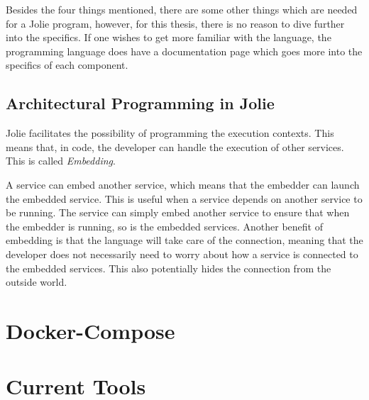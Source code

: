 Besides the four things mentioned, there are some other things which are needed for a Jolie program, however, for this thesis, there is no reason to dive further into the specifics. 
If one wishes to get more familiar with the language, the programming language does have a documentation page which goes more into the specifics of each component.

\subsection{Architectural Programming in Jolie}
Jolie facilitates the possibility of programming the execution contexts.
This means that, in code, the developer can handle the execution of other services. This is called \textit{Embedding}.

A service can embed another service, which means that the embedder can launch the embedded service. This is useful when a service depends on another service to be running.
The service can simply embed another service to ensure that when the embedder is running, so is the embedded services.
Another benefit of embedding is that the language will take care of the connection, meaning that the developer does not necessarily need to worry about how a service is connected to the embedded services.
This also potentially hides the connection from the outside world. 

\section{Docker-Compose}

\section{Current Tools}
